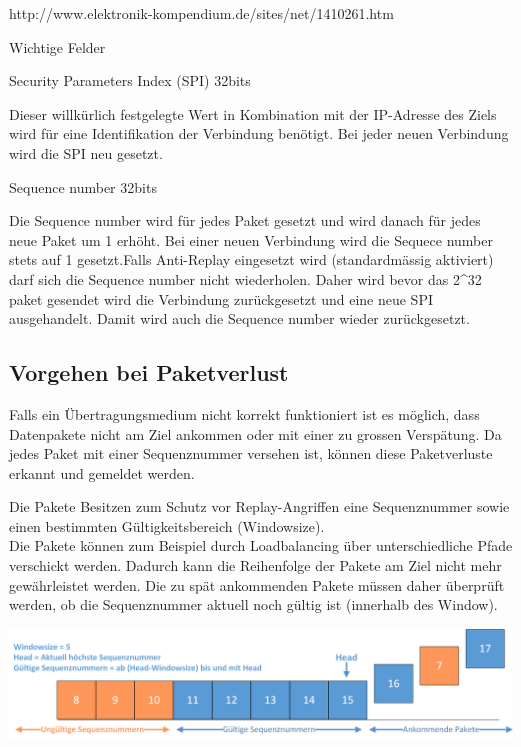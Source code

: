 \noindent http://www.elektronik-kompendium.de/sites/net/1410261.htm

\noindent Wichtige Felder

\noindent Security Parameters Index (SPI) 32bits

\noindent Dieser willkürlich festgelegte Wert in Kombination mit der IP-Adresse des Ziels wird für eine Identifikation der Verbindung benötigt. Bei jeder neuen Verbindung wird die SPI neu gesetzt.

\noindent Sequence number 32bits

\noindent Die Sequence number wird für jedes Paket gesetzt und wird danach für jedes neue Paket um 1 erhöht. Bei einer neuen Verbindung wird die Sequece number stets auf 1 gesetzt.Falls Anti-Replay eingesetzt wird (standardmässig aktiviert) darf sich die Sequence number nicht wiederholen. Daher wird bevor das 2\^{}32 paket gesendet wird die Verbindung zurückgesetzt und eine neue SPI ausgehandelt. Damit wird auch die Sequence number wieder zurückgesetzt.

\noindent 


\subsection{Vorgehen bei Paketverlust}

{\raggedright
Falls ein \"{U}bertragungsmedium nicht korrekt funktioniert ist es m\"{o}glich,
dass Datenpakete nicht am Ziel ankommen oder mit einer zu grossen Versp\"{a}tung.
Da jedes \esp Paket mit einer Sequenznummer versehen ist, k\"{o}nnen diese
Paketverluste erkannt und gemeldet werden.
}

{\raggedright
Die \esp Pakete Besitzen zum Schutz vor Replay-Angriffen eine Sequenznummer sowie
einen bestimmten G\"{u}ltigkeitsbereich (Windowsize).
\\
Die Pakete k\"{o}nnen zum Beispiel durch Loadbalancing \"{u}ber unterschiedliche
Pfade verschickt werden. Dadurch kann die Reihenfolge der Pakete am Ziel nicht
mehr gew\"{a}hrleistet werden. Die zu sp\"{a}t ankommenden Pakete m\"{u}ssen
daher \"{u}berpr\"{u}ft werden, ob die Sequenznummer aktuell noch g\"{u}ltig ist
(innerhalb des Window).
}

\includegraphics[width=1\textwidth]{start/img/Sequenznummern.png}

